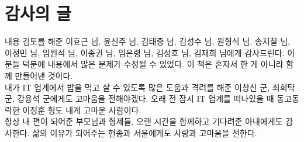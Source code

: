 \section*{감사의 글}
내용 검토를 해준 이효근 님, 윤신주 님, 김태중 님, 김성수 님, 원형식 님, 송지철 님, 이정민 님, 임원석 님, 이종권 님, 임은령 님, 김성호 님, 김재희 님에게 감사드린다. 
이 분들 덕분에 내용에서 많은 문제가 수정될 수 있었다. 이 책은 혼자서 한 게 아니라 함께 만들어낸 것이다.\\

내가 IT 업계에서 밥을 먹고 살 수 있도록 많은 도움과 격려를 해준 이창신 군, 최희탁 군, 강용석 군에게도 고마움을 전해야겠다.
오래 전 잠시 IT 업계를 떠나있을 때 동고동락한 이정훈 형도 내게 고마운 사람이다.\\

항상 내 편이 되어준 부모님과 형제들, 
오랜 시간을 함께하고 기다려준 아내에게도 감사한다. 삶의 이유가 되어주는 현종과 서윤에게도 사랑과 고마움을 전한다.

\begin{comment}
필자는 회사에서 능력을 인정받거나 화려한 기술을 가진 것도 아닌 평범한 개발자이다. 
다만 문제를 겪고 해결할 때마다 메모하고 시간을 내서 내용을 정리한 것 뿐이다.
정리한 내용은 지력이 갈수록 떨어지는 필자를 위한 것이기도 하다.\\

나도 책과 인터넷에서 많은 도움을 받았다. 
오래 전 팀 동료가 그런 얘기를 했다. ``국내 IT서적은 다 쓰레기다'' 그 동료는 책 꽂이에 원서만 나열해놓고 있었다.
어쩌면 쓰레기 하나를 더 만들었는지도 모르겠다.

좌충우돌한 이야기

예민한 내용이 많아서 오류가 있을 수 있다. 혹시 오류라고 생각한다면 제보 바란다.

죄와벌 이나 태백산맥 같은 역작을 내는 것도 아닌데, 무슨 시간이 이리 많이 걸리는지..
\end{comment}